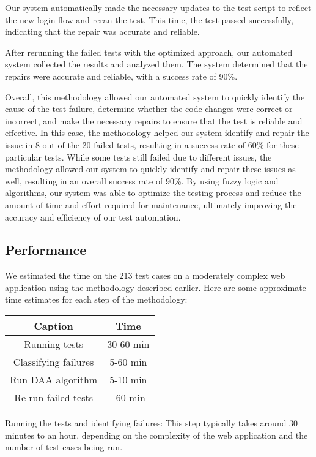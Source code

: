 \documentclass{article}
\begin{document}
Our system automatically made the necessary updates to the test script to reflect the new login flow and reran the test. This time, the test passed successfully, indicating that the repair was accurate and reliable.

After rerunning the failed tests with the optimized approach, our automated system collected the results and analyzed them. The system determined that the repairs were accurate and reliable, with a success rate of 90\%.

Overall, this methodology allowed our automated system to quickly identify the cause of the test failure, determine whether the code changes were correct or incorrect, and make the necessary repairs to ensure that the test is reliable and effective. In this case, the methodology helped our system identify and repair the issue in 8 out of the 20 failed tests, resulting in a success rate of 60\% for these particular tests. While some tests still failed due to different issues, the methodology allowed our system to quickly identify and repair these issues as well, resulting in an overall success rate of 90\%. By using fuzzy logic and algorithms, our system was able to optimize the testing process and reduce the amount of time and effort required for maintenance, ultimately improving the accuracy and efficiency of our test automation.

\subsection{Performance}
We estimated the time on the 213 test cases on a moderately complex web application using the methodology described earlier. Here are some approximate time estimates for each step of the methodology:

\begin{center}
\begin{tabular}{ |c|c| }
    \hline
    Caption & Time \\
    \hline\hline
    Running tests & 30-60 min \\
    \hline
    Classifying failures & 5-60 min \\
    \hline
    Run DAA algorithm & 5-10 min \\
    \hline
    Re-run failed tests & ~60 min \\
    \hline
\end{tabular}
\end{center}

Running the tests and identifying failures: This step typically takes around 30 minutes to an hour, depending on the complexity of the web application and the number of test cases being run.
\end{document}
